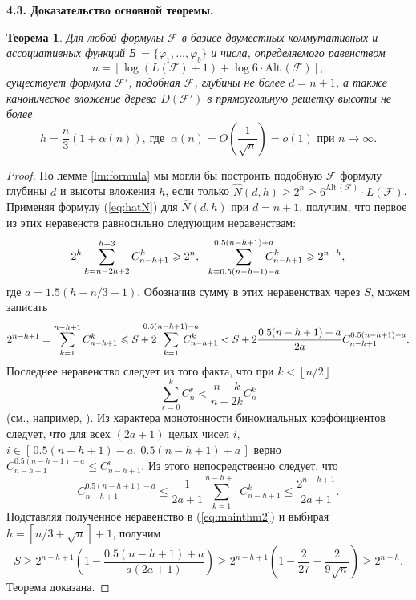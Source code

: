\documentclass[12pt, a4paper]{article}
\theoremstyle{plain}
\newtheorem{theorem}{Теорема}
\theoremstyle{definition}
\theoremstyle{definition}
\newcommand{\Sum}{\displaystyle\sum\limits}
\newcommand{\floor}[1]{\left\lfloor{#1}\right\rfloor}
\newcommand{\ceil}[1]{\left\lceil{#1}\right\rceil}
\renewcommand{\le}{\leqslant}
\renewcommand{\ge}{\geqslant}
\renewcommand{\hat}{\widehat}
\renewcommand{\phi}{\varphi}
\newcommand{\Alt}{\mathrm{Alt}\,}
\newcommand{\N}{\hat{N}}
\newcommand{\F}{\mathscr{F}}
\begin{document}
{\bfseries 4.3. Доказательство основной теоремы.}\ 
\begin{theorem} 
\label{thm:spec}
Для любой формулы $\F$ в базисе двуместных коммутативных и ассоциативных
функций \textup{Б}$~ = \{\phi_1, \dots, \phi_b \}$ и числа\textup{,} определяемого равенством
\[
	n = \ceil{\log (L(\F) + 1) + \log  6 \cdot \Alt(\F)},
\]
существует формула  $\F'$\textup{,} подобная $\F$\textup{,} глубины не более $d = n + 1$\textup{,} 
а также каноническое вложение дерева $D(\F')$ в прямоугольную решетку высоты не более
\[
	h = \frac{n}{3}(1 + \alpha(n)), ~\text{где }~\alpha(n) = O(\frac{1}{\sqrt{n}}) = o(1) \text{ при } n \rightarrow \infty.
\]
\end{theorem}

\begin{proof}
По лемме \ref{lm:formula} мы могли бы построить подобную $\F$ формулу глубины $d$ и высоты вложения $h$, если только
$\N(d,h) \ge 2^n \ge 6^{\Alt(\F)} \cdot L(\F)$. Применяя формулу (\ref{eq:hatN}) для $\N(d,h)$ при $d = n + 1$, получим, что первое из этих неравенств 
равносильно следующим неравенствам\textup{:}
\[
	2^h \Sum_{k=n-2h+2}^{h+3} C_{n-h+1}^k \ge 2^n, ~~ \Sum_{k=0.5(n-h+1) - a}^{0.5(n-h+1) + a}\mspace{-26mu} C_{n-h+1}^k \ge 2^{n-h},
\]
где $a = 1.5(h - n/3 - 1)$. Обозначив сумму в этих неравенствах через $S$, можем записать
\begin{equation}
\label{eq:mainthm2}
2^{n-h+1}= \Sum_{k=1}^{n-h+1} C_{n-h+1}^k \le S + 2\mspace{-26mu}\sum_{k=1}^{0.5(n-h+1)-a}\mspace{-30mu}C_{n-h+1}^k < %
S + 2\frac{0.5(n-h+1) + a}{2a}C_{n-h+1}^{0.5(n-h+1)-a}.
\end{equation}
Последнее неравенство следует из того факта, что при $k < \floor{n/2}$ 
\[
	\Sum_{r=0}^k C_n^r < \frac{n-k}{n-2k} C_n^k
\]
(см., например, \cite{selezn}). Из характера монотонности биномиальных коэффициентов следует, что для всех $(2a+1)$ целых чисел  $i$, $i \in  [\,0.5(n-h+1) - a,\ 0.5(n-h+1) + a\,]$ верно 
$
C_{n-h+1}^{0.5(n-h+1)-a} \le C_{n-h+1}^i.
$
Из этого непосредственно следует, что
\[
C_{n-h+1}^{0.5(n-h+1)-a} \le \frac{1}{2a+1}\Sum_{k=1}^{n-h+1} C_{n-h+1}^k \le \frac{2^{n-h+1}}{2a + 1}.
\]
Подставляя полученное неравенство в (\ref{eq:mainthm2}) и выбирая  $h = \ceil{n/3 + \sqrt{n}} + 1$, получим
\[
S \ge 2^{n-h+1}(1 - \frac{0.5(n-h+1) + a}{a(2a+1)}) \ge 2^{n-h+1}(1- \frac{2}{27}  - \frac{2}{9\sqrt{n}}) \ge 2^{n-h}.
\]
Теорема доказана.
\end{proof}
\end{document}
